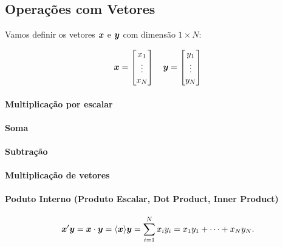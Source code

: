 \documentclass[11pt, oneside, a4paper, article]{article}
\numberwithin{equation}{section}
\begin{document}
\begin{description}
\subsection{Operações com Vetores}

Vamos definir os vetores $\boldsymbol{x}$ e $\boldsymbol{y}$ com dimensão $1 \times N$:

\begin{align*}
	\boldsymbol{x} = 
	\begin{bmatrix}
		x_{1} \\ \vdots \\ x_{N}	
	\end{bmatrix}
	\quad
	\boldsymbol{y} = 
	\begin{bmatrix}
		y_{1} \\ \vdots \\ y_{N}	
	\end{bmatrix}
\end{align*}

\paragraph{Multiplicação por escalar}

\paragraph{Soma}

\paragraph{Subtração}

\paragraph{Multiplicação de vetores}

\paragraph{Poduto Interno (Produto Escalar, Dot Product, Inner Product)}

\begin{align}\label{innerp}
	\boldsymbol{x}' \boldsymbol{y} = \boldsymbol{x} \cdot \boldsymbol{y} = \langle \boldsymbol{x} \rangle{\ensuremath{\boldsymbol{y}}} = \sum_{i=1}^{N} x_{i} y_{i} = x_{1}y_{1} + \dots + x_{N}y_{N}.
\end{align}


\end{description}
\end{document}
